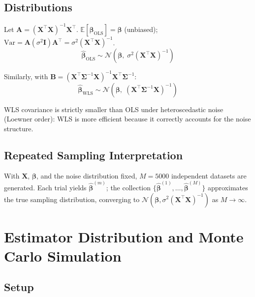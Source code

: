 \documentclass[11pt,a4paper]{article}
\begin{document}
\subsection{Distributions}

Let $\mathbf{A}=(\mathbf{X}^\top\mathbf{X})^{-1}\mathbf{X}^\top$.
$\mathbb{E}[\hat{\boldsymbol{\beta}}_{\mathrm{OLS}}]=\boldsymbol{\beta}$ (unbiased);
$\mathrm{Var}=\mathbf{A}(\sigma^2\mathbf{I})\mathbf{A}^\top=\sigma^2(\mathbf{X}^\top\mathbf{X})^{-1}$.
\begin{equation}
\boxed{\hat{\boldsymbol{\beta}}_{\mathrm{OLS}}\sim\mathcal{N}\!\left(\boldsymbol{\beta},\;\sigma^2(\mathbf{X}^\top\mathbf{X})^{-1}\right)}
\end{equation}

Similarly, with $\mathbf{B}=(\mathbf{X}^\top\boldsymbol{\Sigma}^{-1}\mathbf{X})^{-1}\mathbf{X}^\top\boldsymbol{\Sigma}^{-1}$:
\begin{equation}
\boxed{\hat{\boldsymbol{\beta}}_{\mathrm{WLS}}\sim\mathcal{N}\!\left(\boldsymbol{\beta},\;(\mathbf{X}^\top\boldsymbol{\Sigma}^{-1}\mathbf{X})^{-1}\right)}
\end{equation}

WLS covariance is strictly smaller than OLS under heteroscedastic noise (Loewner order):
WLS is more efficient because it correctly accounts for the noise structure.

\subsection{Repeated Sampling Interpretation}

With $\mathbf{X}$, $\boldsymbol{\beta}$, and the noise distribution fixed, $M=5000$ independent datasets
are generated. Each trial yields $\hat{\boldsymbol{\beta}}^{(m)}$; the collection
$\{\hat{\boldsymbol{\beta}}^{(1)},\ldots,\hat{\boldsymbol{\beta}}^{(M)}\}$ approximates the true sampling
distribution, converging to $\mathcal{N}(\boldsymbol{\beta},\sigma^2(\mathbf{X}^\top\mathbf{X})^{-1})$ as $M\to\infty$.

\section{Estimator Distribution and Monte Carlo Simulation}
\label{sec:simulation}

\subsection{Setup}
\end{document}
